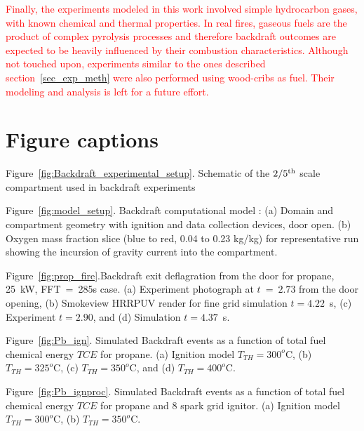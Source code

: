 \documentclass[12pt,letterpaper]{article}
\begin{document}
\begin{flushleft}
\textcolor{red}{Finally, the experiments modeled in this work involved simple hydrocarbon gases, with known chemical and thermal properties. In real fires, gaseous fuels are the product of complex pyrolysis processes and therefore backdraft outcomes are expected to be heavily influenced by their combustion characteristics. Although not touched upon, experiments similar to the ones described section~\ref{sec_exp_meth} were also performed using wood-cribs as fuel. Their modeling and analysis is left for a future effort.} 



	
\newpage %
\section*{Figure captions}
Figure~\ref{fig:Backdraft_experimental_setup}. Schematic of the $2/5^{\rm{th}}$ scale compartment used in backdraft experiments

Figure~\ref{fig:model_setup}. Backdraft computational model : (a) Domain and compartment geometry with ignition and data collection devices, door open. (b) Oxygen mass fraction slice (blue to red, 0.04 to 0.23 kg/kg) for representative run showing the incursion of gravity current into the compartment.

Figure~\ref{fig:prop_fire}.Backdraft exit deflagration from the door for propane, 25~kW, FFT~=~285s case. (a) Experiment photograph at $t~=~2.73$ from the door opening, (b) Smokeview HRRPUV render for fine grid simulation $t=4.22$~s, (c) Experiment $t=2.90$, and (d) Simulation $t=4.37$~s.

Figure~\ref{fig:Pb_ign}. Simulated Backdraft events as a function of total fuel chemical energy $TCE$ for propane. (a) Ignition model $T_{TH}=300^o$C, (b) $T_{TH}=325^o$C, (c) $T_{TH}=350^o$C, and (d) $T_{TH}=400^o$C.

Figure~\ref{fig:Pb_ignproc}. Simulated Backdraft events as a function of total fuel chemical energy $TCE$ for propane and 8 spark grid ignitor. (a) Ignition model $T_{TH}=300^o$C, (b) $T_{TH}=350^o$C.



\end{flushleft}
\end{document}
